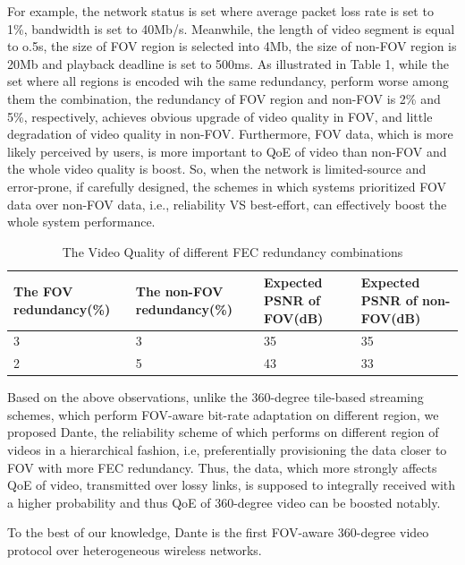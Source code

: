    For example, the network status is set where average packet loss rate is set to 1\%, bandwidth is set to 40Mb/s. Meanwhile, the length of video segment is equal to o.5s, the size of FOV region is selected into 4Mb, the size of non-FOV region is 20Mb and playback deadline is set to 500ms. As illustrated in Table 1, while the set where all regions is encoded wih the same redundancy, perform worse among them the combination, the redundancy of FOV region and non-FOV is 2\% and 5\%, respectively, achieves obvious upgrade of video quality in FOV, and little degradation of video quality in non-FOV. Furthermore, FOV data, which is more likely perceived by users, is more important to QoE of video than non-FOV and the whole video quality is boost. So, when the network is limited-source and error-prone, if carefully designed, the schemes in which systems prioritized FOV data over non-FOV data, i.e., reliability VS best-effort, can effectively boost the whole system performance.       
	
	\begin{table}
		\centering 
		\scriptsize
		\begin{tabular}{p{2.0cm}p{2.0cm}p{1.6cm}p{1.6cm}}
			\rowcolor[gray]{0.9} 
			\hline
			The FOV redundancy(\%) &The non-FOV redundancy(\%) & Expected PSNR of FOV(dB) & Expected PSNR of non-FOV(dB)\\
			\hline
			3  &  3  &  35  &  35\\    
			\hline
			2  &  5  &  43  &  33\\ 
			\hline
			
		\end{tabular}
		\caption{The Video Quality of different FEC redundancy combinations}
		\label{}
	\end{table}
	 
	 
	Based on the above observations, unlike the 360-degree tile-based streaming schemes, which perform FOV-aware bit-rate adaptation on different region, we proposed Dante, the reliability scheme of which performs on different region of videos in a hierarchical fashion, i.e, preferentially provisioning the data closer to FOV with more FEC redundancy. Thus, the data, which more strongly affects QoE of video, transmitted over lossy links, is supposed to integrally received with a higher probability and thus QoE of 360-degree video can be boosted notably.
 
To the best of our knowledge, Dante is the first FOV-aware 360-degree video protocol over heterogeneous wireless networks.






